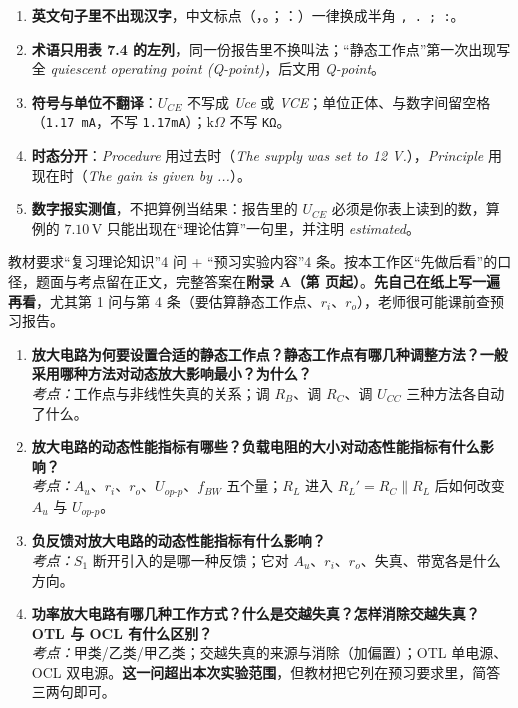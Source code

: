 \documentclass[11pt]{ctexart}
\let\orighdr\hdr
\renewcommand{\hdr}[2]{\needspace{12\baselineskip}\orighdr{#1}{#2}}
\let\origsubhdr\subhdr
\renewcommand{\subhdr}[1]{\needspace{3\baselineskip}\origsubhdr{#1}}
\begin{document}

\begin{enumerate}
\item \textbf{英文句子里不出现汉字}，中文标点（，。；：）一律换成半角 \texttt{, . ; :}。
\item \textbf{术语只用表 7.4 的左列}，同一份报告里不换叫法；“静态工作点”第一次出现写全 \textit{quiescent operating point (Q-point)}，后文用 \textit{Q-point}。
\item \textbf{符号与单位不翻译}：$U_{CE}$ 不写成 \textit{Uce} 或 \textit{VCE}；单位正体、与数字间留空格（\texttt{1.17 mA}，不写 \texttt{1.17mA}）；$\mathrm{k}\Omega$ 不写 \texttt{KΩ}。
\item \textbf{时态分开}：\textit{Procedure} 用过去时（\textit{The supply was set to 12 V.}），\textit{Principle} 用现在时（\textit{The gain is given by ...}）。
\item \textbf{数字报实测值}，不把算例当结果：报告里的 $U_{CE}$ 必须是你表上读到的数，算例的 $7.10\,\mathrm{V}$ 只能出现在“理论估算”一句里，并注明 \textit{estimated}。
\end{enumerate}


\noindent 教材要求“复习理论知识”4 问 + “预习实验内容”4 条。按本工作区“先做后看”的口径，题面与考点留在正文，完整答案在\textbf{附录 A（第 \pageref{app:A} 页起）}。\textbf{先自己在纸上写一遍再看}，尤其第 1 问与第 4 条（要估算静态工作点、$r_i$、$r_o$），老师很可能课前查预习报告。


\begin{enumerate}
\item \textbf{放大电路为何要设置合适的静态工作点？静态工作点有哪几种调整方法？一般采用哪种方法对动态放大影响最小？为什么？}\\
\textit{考点：}工作点与非线性失真的关系；调 $R_B$、调 $R_C$、调 $U_{CC}$ 三种方法各自动了什么。
\item \textbf{放大电路的动态性能指标有哪些？负载电阻的大小对动态性能指标有什么影响？}\\
\textit{考点：}$A_u$、$r_i$、$r_o$、$U_{op\text{-}p}$、$f_{BW}$ 五个量；$R_L$ 进入 $R_L'=R_C\parallel R_L$ 后如何改变 $A_u$ 与 $U_{op\text{-}p}$。
\item \textbf{负反馈对放大电路的动态性能指标有什么影响？}\\
\textit{考点：}$S_1$ 断开引入的是哪一种反馈；它对 $A_u$、$r_i$、$r_o$、失真、带宽各是什么方向。
\item \textbf{功率放大电路有哪几种工作方式？什么是交越失真？怎样消除交越失真？OTL 与 OCL 有什么区别？}\\
\textit{考点：}甲类/乙类/甲乙类；交越失真的来源与消除（加偏置）；OTL 单电源、OCL 双电源。\textbf{这一问超出本次实验范围}，但教材把它列在预习要求里，简答三两句即可。
\end{enumerate}
\end{document}
